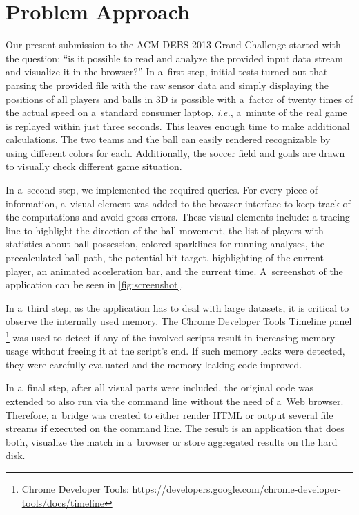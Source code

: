 \documentclass{sig-alternate}
\newcommand{\inlinelistingsize}{\fontsize{8pt}{11pt}}
\let\oldurl\url
\renewcommand{\url}[1]{\inlinelistingsize\oldurl{#1}}
\begin{document}
\section{Problem Approach}
\label{sec:methodology}

Our present submission to the ACM DEBS 2013 Grand Challenge
started with the question: ``is it possible to read and analyze
the provided input data stream and visualize it in the browser?''
In a~first step, initial tests turned out that
parsing the provided file with the raw sensor data
and simply displaying the positions of all players
and balls in 3D is possible with a~factor of twenty times of the actual speed on a~standard consumer laptop,
\emph{i.e.}, a~minute of the real game is replayed
within just three seconds.
This leaves enough time to make additional calculations.
The two teams and the ball can easily rendered recognizable
by using different colors for each.
Additionally, the soccer field and goals are drawn
to visually check different game situation.

In a~second step, we implemented the required queries.
For every piece of information, a~visual element was added
to the browser interface to keep track of the computations
and avoid gross errors.
These visual elements include:
a tracing line to highlight the direction of the ball movement,  
the list of players with statistics about ball possession,
colored sparklines for running analyses,
the precalculated ball path, the potential hit target,
highlighting of the current player,
an animated acceleration bar,
and the current time.
A~screenshot of the application can be seen in
\autoref{fig:screenshot}.

In a~third step, as the application has to deal with large datasets,
it is critical to observe the internally used memory.
The Chrome Developer Tools Timeline panel%
\footnote{Chrome Developer Tools: \url{https://developers.google.com/chrome-developer-tools/docs/timeline}}
was used
to detect if any of the involved scripts
result in increasing memory usage without freeing it at the script's end.
If such memory leaks were detected, they were carefully evaluated and the memory-leaking code improved.

In a~final step, after all visual parts were included,
the original code was extended to also run
via the command line without the need of a~Web browser.
Therefore, a~bridge was created to either render HTML
or output several file streams if executed on the command line.
The result is an application that does both,
visualize the match in a~browser or store aggregated results
on the hard disk.
\end{document}
